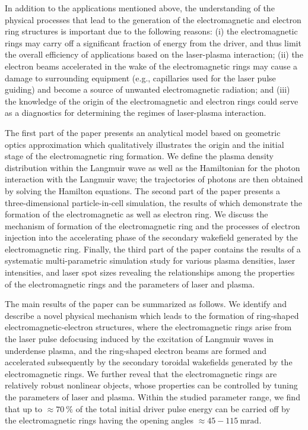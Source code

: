 \documentclass[10pt, a4paper, twoside, openright]{report}
\begin{document}
In addition to the applications mentioned above, the understanding of the physical processes that lead to the generation of the electromagnetic and electron ring structures is important due to the following reasons: (i) the electromagnetic rings may carry off a significant fraction of energy from the driver, and thus limit the overall efficiency of applications based on the laser-plasma interaction; (ii) the electron beams accelerated in the wake of the electromagnetic rings may cause a damage to surrounding equipment (e.g., capillaries used for the laser pulse guiding) and become a source of unwanted electromagnetic radiation; and (iii) the knowledge of the origin of the electromagnetic and electron rings could serve as a diagnostics for determining the regimes of laser-plasma interaction.

The first part of the paper presents an analytical model based on geometric optics approximation which qualitatively illustrates the origin and the initial stage of the electromagnetic ring formation. We define the plasma density distribution within the Langmuir wave as well as the Hamiltonian for the photon interaction with the Langmuir wave; the trajectories of photons are then obtained by solving the Hamilton equations. The second part of the paper presents a three-dimensional particle-in-cell simulation, the results of which demonstrate the formation of the electromagnetic as well as electron ring. We discuss the mechanism of formation of the electromagnetic ring and the processes of electron injection into the accelerating phase of the secondary wakefield generated by the electromagnetic ring. Finally, the third part of the paper contains the results of a systematic multi-parametric simulation study for various plasma densities, laser intensities, and laser spot sizes revealing the relationships among the properties of the electromagnetic rings and the parameters of laser and plasma.

The main results of the paper can be summarized as follows. We identify and describe a novel physical mechanism which leads to the formation of ring-shaped electromagnetic-electron structures, where the electromagnetic rings arise from the laser pulse defocusing induced by the excitation of Langmuir waves in underdense plasma, and the ring-shaped electron beams are formed and accelerated subsequently by the secondary toroidal wakefields generated by the electromagnetic rings. We further reveal that the electromagnetic rings are relatively robust nonlinear objects, whose properties can be controlled by tuning the parameters of laser and plasma. Within the studied parameter range, we find that up to $ \approx 70 \ \% $ of the total initial driver pulse energy can be carried off by the electromagnetic rings having the opening angles $ \approx 45 - 115 \ \mathrm{mrad} $. 
\end{document}
